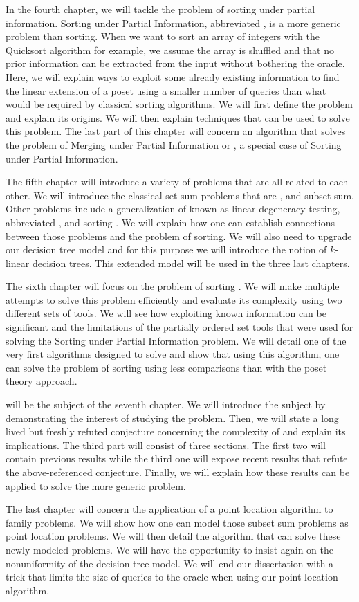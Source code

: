 In the fourth chapter, we will tackle the problem of sorting under partial
information. Sorting under Partial Information, abbreviated , is
a more generic problem than sorting. When we want to sort an array of integers
with the Quicksort algorithm for example, we assume the array is shuffled and
that no prior information can be extracted from the input without bothering the
oracle. Here, we will explain ways to exploit some already existing information
to find the linear extension of a poset using a smaller number of queries than
what would be required by classical sorting algorithms. We will first define
the problem and explain its origins. We will then explain techniques that can
be used to solve this problem. The last part of this chapter will concern an
algorithm that solves the problem of Merging under Partial Information or
, a special case of Sorting under Partial Information.

The fifth chapter will introduce a variety of problems that are all related to
each other. We will introduce the classical set sum problems that are
\threeSUM, \kSUM and subset sum. Other problems include a generalization of
\kSUM known as linear degeneracy testing, abbreviated \kLDT, and sorting \XY.
We will explain how one can establish connections between those problems and the problem
of sorting. We will also need to upgrade our decision tree model and for this
purpose we will introduce the notion of \(k\)-linear decision trees. This
extended model will be used in the three last chapters.

The sixth chapter will focus on the problem of sorting \XY. We will make
multiple attempts to solve this problem efficiently and evaluate its complexity
using two different sets of tools. We will see how exploiting known information
can be significant and the limitations of the partially ordered set tools that
were used for solving the Sorting under Partial Information problem. We will
detail one of the very first algorithms designed to solve  and
show that using this algorithm, one can solve the problem of sorting \XY
using less comparisons than with the poset theory approach.

\threeSUM will be the subject of the seventh chapter. We will introduce the
subject by demonstrating the interest of studying the \threeSUM problem. Then,
we will state a long lived but freshly refuted conjecture concerning the
complexity of \threeSUM and explain its implications. The third part will
consist of three sections. The first two will contain previous results while
the third one will expose recent results that refute the above-referenced
conjecture. Finally, we will explain how these results can be applied to solve
the more generic \kLDT problem.

The last chapter will concern the application of a point location algorithm to
\kSUM family problems. We will show how one can model those subset sum
problems as point location problems. We will then detail the algorithm that
can solve these newly modeled problems. We will have the opportunity to insist again
on the nonuniformity of the decision tree model. We will end our dissertation
with a trick that limits the size of queries to the oracle when
using our point location algorithm.
